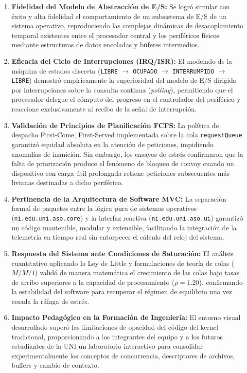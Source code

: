 \documentclass[11pt,letterpaper]{article}
\begin{document}
\begin{enumerate}
    \item \textbf{Fidelidad del Modelo de Abstracción de E/S:} Se logró simular con éxito y alta fidelidad el comportamiento de un subsistema de E/S de un sistema operativo, reproduciendo las complejas dinámicas de desacoplamiento temporal existentes entre el procesador central y los periféricos físicos mediante estructuras de datos encoladas y búferes intermedios.
    \item \textbf{Eficacia del Ciclo de Interrupciones (IRQ/ISR):} El modelado de la máquina de estados discreta (\texttt{LIBRE} $\rightarrow$ \texttt{OCUPADO} $\rightarrow$ \texttt{INTERRUMPIDO} $\rightarrow$ \texttt{LIBRE}) demostró empíricamente la superioridad del modelo de E/S dirigida por interrupciones sobre la consulta continua (\textit{polling}), permitiendo que el procesador delegue el cómputo del progreso en el controlador del periférico y reaccione exclusivamente al recibo de la señal de interrupción.
    \item \textbf{Validación de Principios de Planificación FCFS:} La política de despacho First-Come, First-Served implementada sobre la cola \texttt{requestQueue} garantizó equidad absoluta en la atención de peticiones, impidiendo anomalías de inanición. Sin embargo, los ensayos de estrés confirmaron que la falta de priorización produce el fenómeno de bloqueo de convoy cuando un dispositivo con carga útil prolongada retiene peticiones subsecuentes más livianas destinadas a dicho periférico.
    \item \textbf{Pertinencia de la Arquitectura de Software MVC:} La separación formal de paquetes entre la lógica pura de sistemas operativos (\texttt{ni.edu.uni.aso.core}) y la interfaz reactiva (\texttt{ni.edu.uni.aso.ui}) garantizó un código mantenible, modular y extensible, facilitando la integración de la telemetría en tiempo real sin entorpecer el cálculo del reloj del sistema.
    \item \textbf{Respuesta del Sistema ante Condiciones de Saturación:} El análisis cuantitativo aplicando la Ley de Little y formulaciones de teoría de colas ($M/M/1$) validó de manera matemática el crecimiento de las colas bajo tasas de arribo superiores a la capacidad de procesamiento ($\rho = 1.20$), confirmando la estabilidad del software para recuperar el régimen de equilibrio una vez cesada la ráfaga de estrés.
    \item \textbf{Impacto Pedagógico en la Formación de Ingeniería:} El entorno visual desarrollado superó las limitaciones de opacidad del código del kernel tradicional, proporcionando a los integrantes del equipo y a los futuros estudiantes de la UNI un laboratorio interactivo para consolidar experimentalmente los conceptos de concurrencia, descriptores de archivos, buffers y cambio de contexto.
\end{enumerate}
\end{document}
